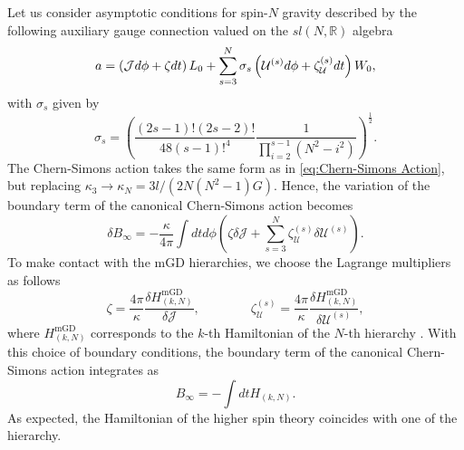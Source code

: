 \documentclass[letterpaper,11pt,oneside]{book}
\begin{document}
Let us consider asymptotic conditions for spin-$N$ gravity described
by the following auxiliary gauge connection valued on the $sl\left(N,\mathbb{R}\right)$
algebra
\begin{equation}
	a=\left({\cal J}d\phi+\zeta dt\right)L_{0}+\sum_{s=3}^{N}\sigma_{s}\left(\mathcal{U}^{\left(s\right)}d\phi+\zeta_{\mathcal{U}}^{\left(s\right)}dt\right)W_{0},\label{eq:Auxiliary Connections SLN}
\end{equation}
with $\sigma_{s}$ given by 
\[
\sigma_{s}=\left(\frac{\left(2s-1\right)!\left(2s-2\right)!}{48(s-1)!^{4}}\frac{1}{\prod_{i=2}^{s-1}\left(N^{2}-i^{2}\right)}\right)^{\frac{1}{2}}.
\]
The Chern-Simons action takes the same form as in \eqref{eq:Chern-Simons Action},
but replacing $\kappa_{3}\rightarrow\kappa_{N}=3l/(2N(N^{2}-1)G)$.
Hence, the variation of the boundary term of the canonical Chern-Simons
action becomes
\begin{equation}
	\delta B_{\infty}=-\frac{\kappa}{4\pi}\int dtd\phi\left(\zeta\delta\mathcal{J}+\sum_{s=3}^{N}\zeta_{\mathcal{U}}^{\left(s\right)}\delta\mathcal{U}^{\left(s\right)}\right).\label{eq:Variation of boundary terms-1}
\end{equation}
To make contact with the mGD hierarchies, we choose the Lagrange multipliers
as follows
\begin{equation}
	\zeta=\frac{4\pi}{\kappa}\frac{\delta H_{\left(k,N\right)}^{\text{mGD}}}{\delta\mathcal{J}},\qquad\qquad\zeta_{\mathcal{U}}^{\left(s\right)}=\frac{4\pi}{\kappa}\frac{\delta H_{\left(k,N\right)}^{\text{mGD}}}{\delta\mathcal{U}^{\left(s\right)}},\label{eq:chemical potentials-1}
\end{equation}
where $H_{\left(k,N\right)}^{\text{mGD}}$ corresponds to the $k$-th
Hamiltonian of the $N$-th hierarchy \cite{Drinfeld:1984qv}. With
this choice of boundary conditions, the boundary term of the canonical
Chern-Simons action integrates as 
\[
B_{\infty}=-\int dtH_{\left(k,N\right)}.
\]
As expected, the Hamiltonian of the higher spin theory coincides with
one of the hierarchy.
\end{document}
